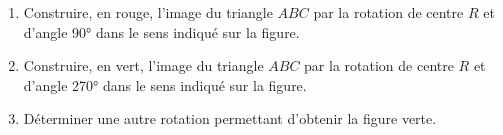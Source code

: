 \begin{exercice*}
    \begin{enumerate}
        \item Construire, en rouge, l'image du triangle $ABC$ par la rotation de centre $R$ et d'angle \ang{90} dans le sens indiqué sur la figure.
        \item Construire, en vert, l'image du triangle $ABC$ par la rotation de centre $R$ et d'angle \ang{270} dans le sens indiqué sur la figure.
        \item Déterminer une autre rotation permettant d'obtenir la figure verte.
    \end{enumerate}
\end{exercice*}
